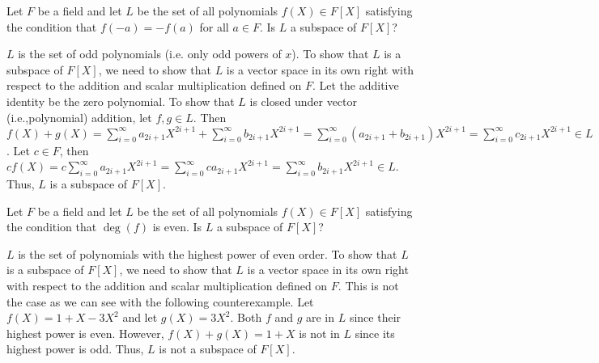 \begin{ProbBox} %
\begin{problem}[Golan 132]
Let $F$ be a field and let $L$ be the set of all polynomials $f(X) \in F[X]$
satisfying the condition that $f(-a) = -f(a)$ for all $a\in F$.  Is $L$ a
subspace of $F[X]$?
\end{problem}
\smallskip
\begin{solution}
$L$ is the set of odd polynomials (i.e. only odd powers of $x$). To show that $L$ is a subspace of $F[X]$, we need to show that $L$ is a vector space in its own right with respect to the addition and scalar multiplication defined on $F$. Let the additive identity be the zero polynomial. To show that $L$ is closed under vector (i.e.,polynomial) addition, let $f,g \in L$. Then $f(X)+g(X)=\sum\limits_{i=0}^\infty a_{2i+1}X^{2i+1} + \sum\limits_{i=0}^\infty b_{2i+1}X^{2i+1} = \sum\limits_{i=0}^\infty (a_{2i+1} + b_{2i+1})X^{2i+1} = \sum\limits_{i=0}^\infty c_{2i+1}X^{2i+1} \in L$. Let $c \in F$, then $cf(X) = c\sum\limits_{i=0}^\infty a_{2i+1}X^{2i+1} = \sum\limits_{i=0}^\infty ca_{2i+1}X^{2i+1} = \sum\limits_{i=0}^\infty b_{2i+1}X^{2i+1} \in L$. Thus, $L$ is a subspace of $F[X]$.
\end{solution}
\end{ProbBox}
\probskip

\begin{ProbBox} %
\begin{problem}[Golan 133]
Let $F$ be a field and let $L$ be the set of all polynomials $f(X) \in F[X]$
satisfying the condition that $\deg(f)$ is even.  Is $L$ a subspace of $F[X]$?
\end{problem}
\smallskip
\begin{solution}
$L$ is the set of polynomials with the highest power of even order. To show that $L$ is a subspace of $F[X]$, we need to show that $L$ is a vector space in its own right with respect to the addition and scalar multiplication defined on $F$. This is not the case as we can see with the following counterexample. Let $f(X)=1+X-3X^2$ and let $g(X)=3X^2$. Both $f$ and $g$ are in $L$ since their highest power is even. However, $f(X)+g(X)=1+X$ is not in $L$ since its highest power is odd. Thus, $L$ is not a subspace of $F[X]$.
\end{solution}
\end{ProbBox}
\probskip

